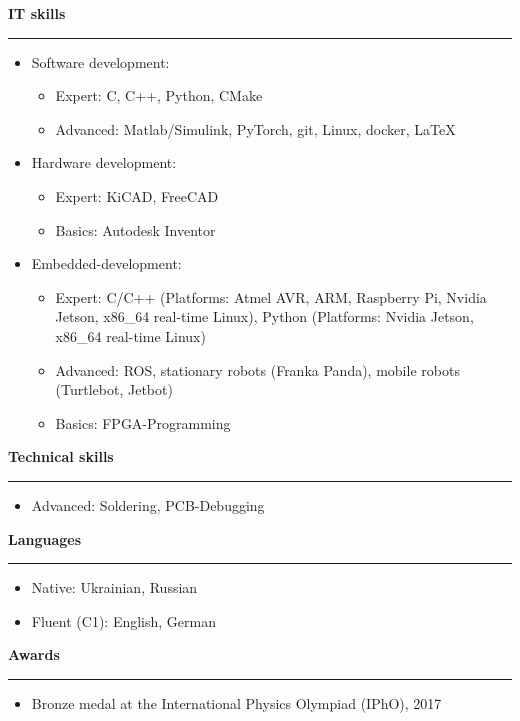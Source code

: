 \documentclass[12pt]{article} %
\newcommand{\HighlightedText}[1] {{\textbf{#1}}}
\newenvironment{ItemizeSection}[1]{
    \vspace{1mm}
    \HighlightedText{#1}
    \vspace{0.5mm}
    {\color{custom_blue} \hrule}
    \begin{itemize}[left=0.5em, topsep=0pt, itemsep=0pt, label={$\bullet$}]
}{
    \end{itemize}
}
\newenvironment{ItemizeSubsection}{
    \begin{itemize}[left=0.5em, topsep=-999pt, itemsep=0pt, label={$\circ$}]
}{
    \end{itemize}
}
\begin{document}
\newpage
\begin{ItemizeSection}{IT skills}
    \item Software development:
    \begin{ItemizeSubsection}
        \item Expert: C, C++, Python, CMake
        \item Advanced: Matlab/Simulink, PyTorch, git, Linux, docker, \LaTeX
    \end{ItemizeSubsection}
    \item Hardware development:
    \begin{ItemizeSubsection}
        \item Expert: KiCAD, FreeCAD
        \item Basics: Autodesk Inventor
    \end{ItemizeSubsection}
    \item Embedded-development:
    \begin{ItemizeSubsection}
        \item Expert: C/C++ (Platforms: Atmel AVR, ARM, Raspberry Pi, Nvidia Jetson, x86\_64 real-time Linux), Python (Platforms: Nvidia Jetson, x86\_64 real-time Linux)
        \item Advanced: ROS, stationary robots (Franka Panda), mobile robots (Turtlebot, Jetbot)
        \item Basics: FPGA-Programming
    \end{ItemizeSubsection}
\end{ItemizeSection}



\begin{ItemizeSection}{Technical skills}
    \item Advanced: Soldering, PCB-Debugging
\end{ItemizeSection}

\begin{ItemizeSection}{Languages}
    \item Native: Ukrainian, Russian
    \item Fluent (C1): English, German
\end{ItemizeSection}

\begin{ItemizeSection}{Awards}
    \item Bronze medal at the International Physics Olympiad (IPhO), 2017
\end{ItemizeSection}
\end{document}
